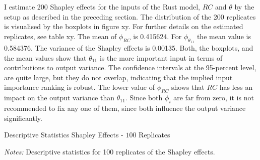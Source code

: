 I estimate 200 Shapley effects for the inputs of the Rust model, $RC$ and $\theta$ by the setup as described in the preceding section. The distribution of the 200 replicates is visualised by the boxplots in figure xy. For further details on the estimated replicates, see table xy. The mean of $\phi_{RC}$ is 0.415624. For $\phi_{\theta_{11}}$ the mean value is 0.584376. The variance of the Shapley effects is 0.00135.
Both, the boxplots, and the mean values show that $\theta_{11}$ is the more important input in terms of contributions to output variance. The confidence intervals at the 95-percent level, are quite large, but they do not overlap, indicating that the implied input importance ranking is robust. The lower value of $\phi_{RC}$ shows that $RC$ has less an impact on the output variance than $\theta_{11}$. Since both $\phi_i$ are far from zero, it is not recommended to fix any one of them, since both influence the output variance significantly.

\begin{table}[t]
	\centering
	\caption{Descriptive Statistics Shapley Effects - $100$ Replicates}
	\label{descriptives}
	\begin{threeparttable}
	\centering
	
	\begin{tablenotes}
	\small
	\item \textit{Notes:} Descriptive statistics for 100 replicates of the Shapley effects.
	\end{tablenotes}
	\end{threeparttable}
\end{table}